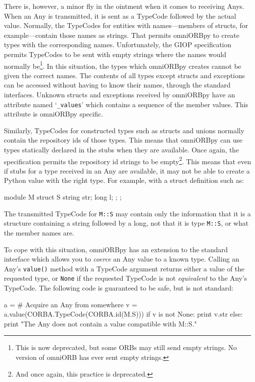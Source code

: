 \documentclass[11pt,twoside,a4paper]{book}
\newcommand{\type}[1]{\texttt{#1}}
\newcommand{\code}[1]{\texttt{#1}}
\newcommand{\op}[1]{\texttt{#1()}}
\newcommand{\term}[1]{\textit{#1}}
\begin{document}
There is, however, a minor fly in the ointment when it comes to
receiving Anys. When an Any is transmitted, it is sent as a TypeCode
followed by the actual value.  Normally, the TypeCodes for entities
with names---members of structs, for example---contain those names as
strings. That permits omniORBpy to create types with the corresponding
names. Unfortunately, the GIOP specification permits TypeCodes to be
sent with empty strings where the names would normally
be\footnote{This is now deprecated, but some ORBs may still send empty
strings. No version of omniORB has ever sent empty strings.}. In this
situation, the types which omniORBpy creates cannot be given the
correct names. The contents of all types except structs and exceptions
can be accessed without having to know their names, through the
standard interfaces. Unknown structs and exceptions received by
omniORBpy have an attribute named `\code{\_values}' which contains a
sequence of the member values. This attribute is omniORBpy specific.

Similarly, TypeCodes for constructed types such as structs and unions
normally contain the repository ids of those types. This means that
omniORBpy can use types statically declared in the stubs when they are
available. Once again, the specification permits the repository id
strings to be empty\footnote{And once again, this practice is
deprecated.}. This means that even if stubs for a type received in an
Any are available, it may not be able to create a Python value with
the right type. For example, with a struct definition such as:

\begin{idllisting}
module M {
  struct S {
    string str;
    long   l;
  };
};
\end{idllisting}

\noindent The transmitted TypeCode for \type{M::S} may contain only
the information that it is a structure containing a string followed by
a long, not that it is type \type{M::S}, or what the member names are.

To cope with this situation, omniORBpy has an extension to the
standard interface which allows you to \term{coerce} an Any value to a
known type. Calling an Any's \op{value} method with a TypeCode
argument returns either a value of the requested type, or \code{None}
if the requested TypeCode is not \term{equivalent} to the Any's
TypeCode. The following code is guaranteed to be safe, but is not
standard:

\begin{pylisting}
a = # Acquire an Any from somewhere
v = a.value(CORBA.TypeCode(CORBA.id(M.S)))
if v is not None:
    print v.str
else:
    print "The Any does not contain a value compatible with M::S."
\end{pylisting}
\end{document}
